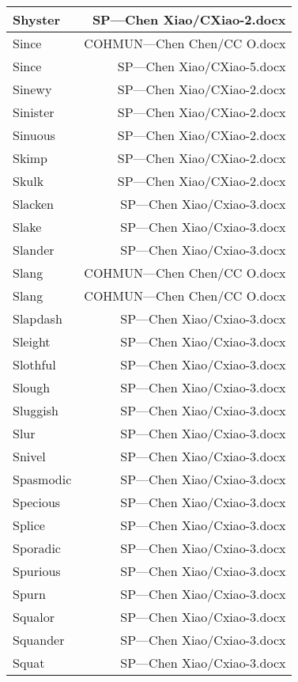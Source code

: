 \documentclass{article}
\begin{document}
\begin{center}
\begin{longtable}{|l|r|}
\hline
Shyster  &  SP---Chen Xiao/CXiao-2.docx\\  
\hline
Since  &  COHMUN---Chen Chen/CC O.docx\\  
\hline
Since  &  SP---Chen Xiao/CXiao-5.docx\\  
\hline
Sinewy  &  SP---Chen Xiao/CXiao-2.docx\\  
\hline
Sinister  &  SP---Chen Xiao/CXiao-2.docx\\  
\hline
Sinuous  &  SP---Chen Xiao/CXiao-2.docx\\  
\hline
Skimp  &  SP---Chen Xiao/CXiao-2.docx\\  
\hline
Skulk  &  SP---Chen Xiao/CXiao-2.docx\\  
\hline
Slacken  &  SP---Chen Xiao/Cxiao-3.docx\\  
\hline
Slake  &  SP---Chen Xiao/Cxiao-3.docx\\  
\hline
Slander  &  SP---Chen Xiao/Cxiao-3.docx\\  
\hline
Slang  &  COHMUN---Chen Chen/CC O.docx\\  
\hline
Slang  &  COHMUN---Chen Chen/CC O.docx\\  
\hline
Slapdash  &  SP---Chen Xiao/Cxiao-3.docx\\  
\hline
Sleight  &  SP---Chen Xiao/Cxiao-3.docx\\  
\hline
Slothful  &  SP---Chen Xiao/Cxiao-3.docx\\  
\hline
Slough  &  SP---Chen Xiao/Cxiao-3.docx\\  
\hline
Sluggish  &  SP---Chen Xiao/Cxiao-3.docx\\  
\hline
Slur  &  SP---Chen Xiao/Cxiao-3.docx\\  
\hline
Snivel  &  SP---Chen Xiao/Cxiao-3.docx\\  
\hline
Spasmodic  &  SP---Chen Xiao/Cxiao-3.docx\\  
\hline
Specious  &  SP---Chen Xiao/Cxiao-3.docx\\  
\hline
Splice  &  SP---Chen Xiao/Cxiao-3.docx\\  
\hline
Sporadic  &  SP---Chen Xiao/Cxiao-3.docx\\  
\hline
Spurious  &  SP---Chen Xiao/Cxiao-3.docx\\  
\hline
Spurn  &  SP---Chen Xiao/Cxiao-3.docx\\  
\hline
Squalor  &  SP---Chen Xiao/Cxiao-3.docx\\  
\hline
Squander  &  SP---Chen Xiao/Cxiao-3.docx\\  
\hline
Squat  &  SP---Chen Xiao/Cxiao-3.docx\\  

\end{longtable}
\end{center}
\end{document}
